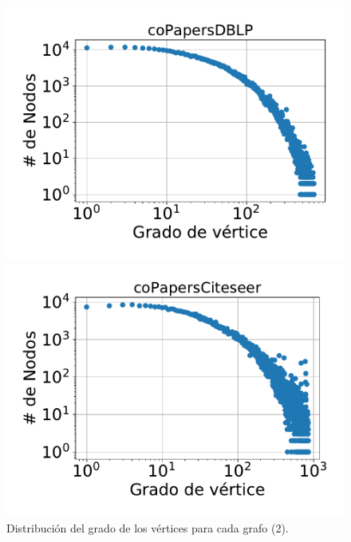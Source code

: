 \begin{frame}
\begin{figure}
    	\begin{minipage}{1\textwidth}
    		\centering
    		\begin{minipage}{0.45\textwidth}
    			\centering
    			\includegraphics[width=1\linewidth]{../img/grades/coPapersDBLP.pdf}
    		\end{minipage}
    		\begin{minipage}{0.45\textwidth}
    			\centering
    			\includegraphics[width=1\linewidth]{../img/grades/coPapersCiteseer.pdf}
    		\end{minipage}  
    	\end{minipage}	

    \caption{Distribución del grado de los vértices para cada grafo (2).}
\end{figure}

\end{frame}





